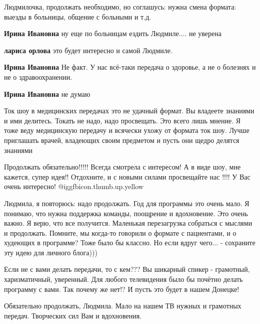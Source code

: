 \begin{itemize}
Людмилочка, продолжать необходимо, но соглашусь: нужна смена формата: выезды в
больницы, общение с больными и т.д.

\begin{itemize} %
\textbf{Ирина Ивановна} ну еще по больницам ездить Людмиле.... не уверена

\textbf{лариса орлова} это будет интересно и самой Людмиле.


\textbf{Ирина Ивановна} Не факт. У нас всё-таки передача о здоровье, а не о болезнях и не о здравоохранении.

\textbf{Ирина Ивановна} не думаю
\end{itemize} %


Ток шоу в медицинских передачах это не удачный формат. Вы владеете знаниями и
ими делитесь. Токать не надо, надо просвещать. Это всего лишь мнение. Я тоже
веду медицинскую передачу и всячески ухожу от формата ток шоу. Лучше приглашать
врачей, владеющих своим предметом и пусть они щедро делятся знаниями


Продолжать обязательно!!!!! Всегда смотрела с интересом! А в виде шоу, мне
кажется, супер идея!! Отдохните, и с новыми силами просвещайте нас !!!! У Вас
очень интересно! @igg{fbicon.thumb.up.yellow} 


Людмила, я повторюсь: надо продолжать. Год для программы это очень мало. Я
понимаю, что нужна поддержка команды, поощрение и вдохновение. Это очень важно.
Я верю, что все получится. Маленькая перезагрузка собраться с мыслями и
продолжать. Помните, мы когда-то говорили о формате с пациентами, и о худеющих
в программе? Тоже было бы классно. Но если вдруг чего... - сохраните эту идею
для личного блога)))


Если не с вами делать передачи, то с кем??? Вы шикарный спикер - грамотный,
харизматичный, уверенный. Для любого телевидения было бы почётно делать
программу с вами. Так почему же нет!? И пусть это будет в нашем Донецке!


Обязательно продолжать, Людмила. Мало на нашем ТВ нужных и грамотных передач.
Творческих сил Вам и вдохновения.

\end{itemize} %
